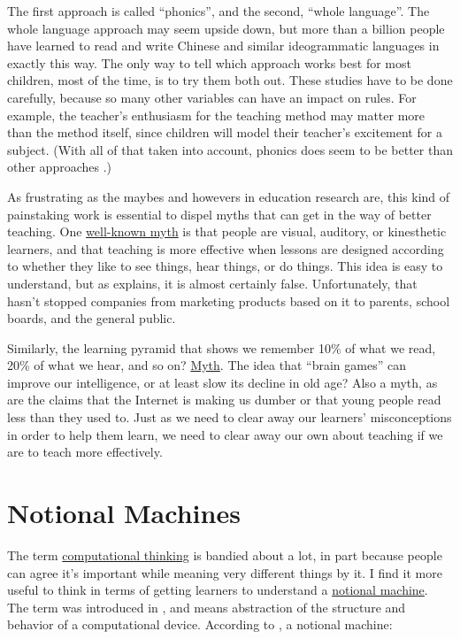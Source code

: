 The first approach is called ``phonics'', and the second, ``whole
language''. The whole language approach may seem upside down, but more
than a billion people have learned to read and write Chinese and similar
ideogrammatic languages in exactly this way. The only way to tell which
approach works best for most children, most of the time, is to try them
both out. These studies have to be done carefully, because so many other
variables can have an impact on rules. For example, the teacher's
enthusiasm for the teaching method may matter more than the method
itself, since children will model their teacher's excitement for a
subject. (With all of that taken into account, phonics does seem to be
better than other approaches \cite{Foor1998}.)

As frustrating as the maybes and howevers in education research are,
this kind of painstaking work is essential to dispel myths that can
get in the way of better teaching. One \href{https://en.wikipedia.org/wiki/Learning_styles\#Learning_modalities}{well-known
myth} is that people are visual, auditory, or
kinesthetic learners, and that teaching is more effective when lessons
are designed according to whether they like to see things, hear
things, or do things. This idea is easy to understand, but as
\cite{DeBr2015} explains, it is almost certainly
false. Unfortunately, that hasn't stopped companies from marketing
products based on it to parents, school boards, and the general
public.

Similarly, the learning pyramid that shows we remember 10\% of what we
read, 20\% of what we hear, and so on? \href{https://www.worklearning.com/2015/01/05/mythical-retention-data-the-corrupted-cone/}{Myth}. The
idea that ``brain games'' can improve our intelligence, or at least slow
its decline in old age? Also a myth, as are the claims that the
Internet is making us dumber or that young people read less than they
used to. Just as we need to clear away our learners' misconceptions in
order to help them learn, we need to clear away our own about teaching
if we are to teach more effectively.

\section{Notional Machines}\label{notional-machines}

The term \protect\hyperlink{g:computational-thinking}{computational thinking} is
bandied about a lot, in part because people can agree it's important
while meaning very different things by it. I find it more useful to
think in terms of getting learners to understand a \protect\hyperlink{g:notional-machine}{notional
machine}. The term was introduced in
\cite{DuBo1986}, and means abstraction of the structure and
behavior of a computational device. According to \cite{Sorv2013},
a notional machine:

